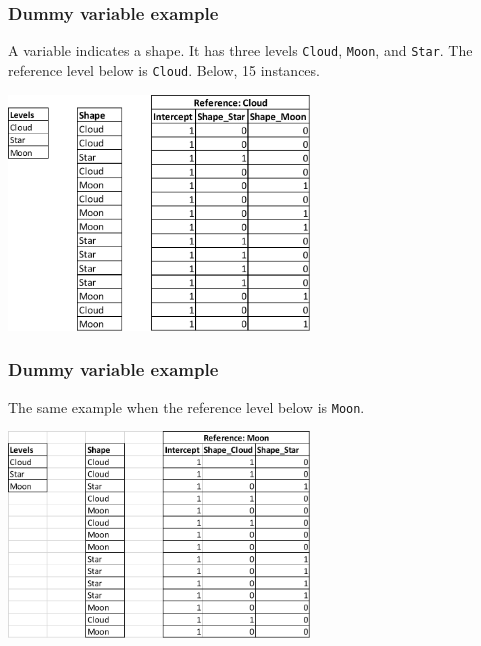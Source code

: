 \begin{frame}
\frametitle{Dummy variable example}
A variable indicates a shape. It has three levels {\tt Cloud}, {\tt Moon}, and {\tt Star}. The reference level below is {\tt Cloud}. Below, 15 instances. 
\begin{center}
\includegraphics[width=8cm]{../Graphs/Dummy_1.png}  
\end{center}
\end{frame}
\begin{frame}
\frametitle{Dummy variable example}
The same example when the reference level below is {\tt Moon}. 
\begin{center}
\includegraphics[width=8cm]{../Graphs/Dummy_2.png}  
\end{center}
\end{frame}

